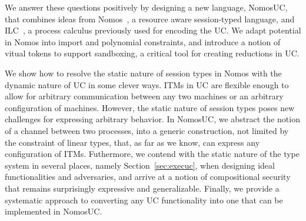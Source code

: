 We answer these questions positively by designing a new language, NomosUC, that combines ideas from
Nomos~\cite{dasnomos}, a resource aware session-typed language, and ILC~\cite{ilc},
a process calculus previously used for encoding the UC.
We adapt potential in Nomos into import and polynomial constraints, and introduce a notion of vitual tokens to support 
sandboxing, a critical tool for creating reductions in UC.

We show how to resolve the static nature of session types in Nomos with the dynamic nature of UC in some clever ways. 
ITMs in UC are flexible enough to allow for arbitrary communication between any two machines or an arbitrary configuration of machines.
However, the static nature of session types poses new challenges for expressing arbitrary behavior.
In NomosUC, we abstract the notion of a channel between two processes, into a generic construction, not limited by the constraint
of linear types, that, as far as we know, can express any configuration of ITMs.
Futhermore, we contend with the static nature of the type system in several places, namely Section~\ref{sec:execuc}, when designing ideal functionalities and adversaries,
and arrive at a notion of compositional security that remains surprisingly expressive and generalizable.
Finally, we provide a systematic approach to converting any UC functionality into one that can be implemented in NomosUC.

